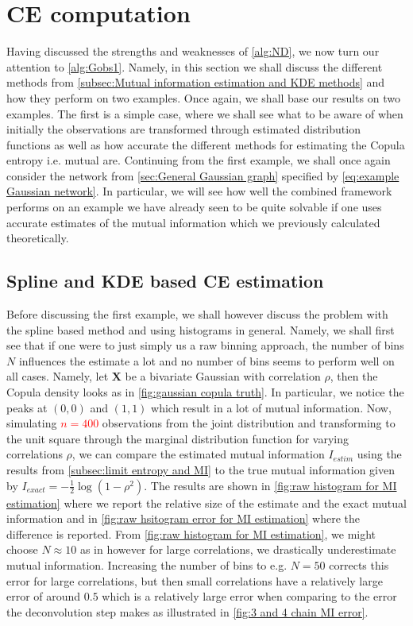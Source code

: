 \documentclass[../Thesis.tex]{subfiles}
\begin{document}
\section{CE computation}\label{sec:gaussian MI error}
Having discussed the strengths and weaknesses of \autoref{alg:ND}, we now turn our attention to \autoref{alg:Gobs1}. Namely, in this section we shall discuss the different methods from \autoref{subsec:Mutual information estimation and KDE methods} and how they perform on two examples. Once again, we shall base our results on two examples. The first is a simple case, where we shall see what to be aware of when initially the observations are transformed through estimated distribution functions as well as how accurate the different methods for estimating the Copula entropy i.e. mutual are. Continuing from the first example, we shall once again consider the network from \autoref{sec:General Gaussian graph} specified by \autoref{eq:example Gaussian network}. In particular, we will see how well the combined framework performs on an example we have already seen to be quite solvable if one uses accurate estimates of the mutual information which we previously calculated theoretically.



\subsection{Spline and KDE based CE estimation}
Before discussing the first example, we shall however discuss the problem with the spline based method and using histograms in general. Namely, we shall first see that if one were to just simply us a raw binning approach, the number of bins $N$ influences the estimate a lot and no number of bins seems to perform well on all cases. Namely, let $\boldsymbol X$ be a bivariate Gaussian with correlation $\rho$, then the Copula density looks as in \autoref{fig:gaussian copula truth}. In particular, we notice the peaks at $(0,0)$ and $(1,1)$ which result in a lot of mutual information. Now, simulating \textcolor{red}{$n = 400$} observations from the joint distribution and transforming to the unit square through the marginal distribution function for varying correlations $\rho$, we can compare the estimated mutual information $I_{estim}$ using the results from \autoref{subsec:limit entropy and MI} to the true mutual information given by $ I_{exact} = - \frac{1}{2} \log \left(1 - \rho^2\right)$. The results are shown in \autoref{fig:raw histogram for MI estimation} where we report the relative size of the estimate and the exact mutual information and in \autoref{fig:raw hsitogram error for MI estimation} where the difference is reported. From \autoref{fig:raw histogram for MI estimation}, we might choose $N \approx 10$ as in \cite{Network-deconvolution-as-a-general-method-to-distinguish-direct-dependencies-in-networks} however for large correlations, we drastically underestimate mutual information. Increasing the number of bins to e.g. $N = 50$ corrects this error for large correlations, but then small correlations have a relatively large error of around $0.5$ which is a relatively large error when comparing to the error the deconvolution step makes as illustrated in \autoref{fig:3 and 4 chain MI error}.
\end{document}
